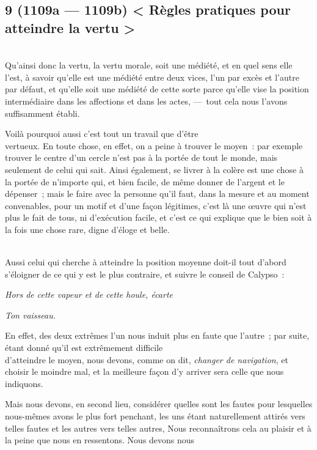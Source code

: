 \documentclass[french,twoside]{book} %
\begin{document}
\subsection[{9 (1109a — 1109b) < Règles pratiques pour atteindre la vertu >}]{9 (1109a — 1109b) < Règles pratiques pour atteindre la vertu >}
\noindent \\
Qu’ainsi donc la vertu, la vertu morale, soit une médiété, et en quel sens elle l’est, à savoir qu’elle est une médiété entre deux vices, l’un par excès et l’autre par défaut, et qu’elle soit une médiété de cette sorte parce qu’elle vise la position intermédiaire dans les affections et dans les actes, — tout cela nous l’avons suffisamment établi.\par
Voilà pourquoi aussi c’est tout un travail que d’être \\
vertueux. En toute chose, en effet, on a peine à trouver le moyen : par exemple trouver le centre d’un cercle n’est pas à la portée de tout le monde, mais seulement de celui qui sait. Ainsi également, se livrer à la colère est une chose à la portée de n’importe qui, et bien facile, de même donner de l’argent et le dépenser ; mais le faire avec la personne qu’il faut, dans la mesure et au moment convenables, pour un motif et d’une façon légitimes, c’est là une œuvre qui n’est plus le fait de tous, ni d’exécution facile, et c’est ce qui explique que le bien soit à la fois une chose rare, digne d’éloge et belle.\par
\\
Aussi celui qui cherche à atteindre la position moyenne doit-il tout d’abord s’éloigner de ce qui y est le plus contraire, et suivre le conseil de Calypso :\par
 {\itshape Hors de cette vapeur et de cette houle, écarte} \par
 {\itshape Ton vaisseau.} \par
En effet, des deux extrêmes l’un nous induit plus en faute que l’autre ; par suite, étant donné qu’il est extrêmement difficile \\
d’atteindre le moyen, nous devons, comme on dit, {\itshape changer de navigation}, et choisir le moindre mal, et la meilleure façon  d’y arriver sera celle que nous indiquons.\par
Mais nous devons, en second lieu, considérer quelles sont les fautes pour lesquelles nous-mêmes avons le plus fort penchant, les uns étant naturellement attirés vers telles fautes et les autres vers telles autres, Nous reconnaîtrons cela au plaisir et à la peine que nous en ressentons. Nous devons nous \\
\end{document}
